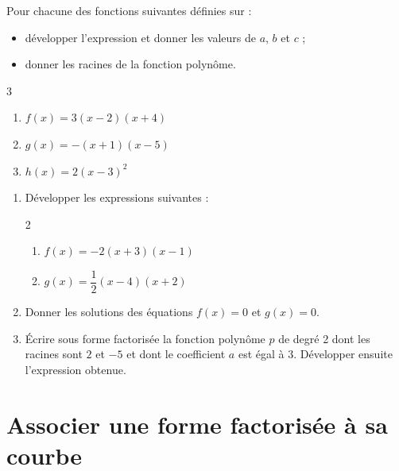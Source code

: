 \documentclass[11pt,a4paper]{book}
\begin{document}
\exerciceDS{}

Pour chacune des fonctions suivantes définies sur \R :
\begin{itemize}
	\item développer l'expression et donner les valeurs de $a$, $b$ et $c$ ;
	\item donner les racines de la fonction polynôme.
\end{itemize}

\begin{multicols}{3}
	\begin{enumerate}[label=\textbf{\alph*)}]
		\item $f(x)=3(x-2)(x+4)$
		\item $g(x)=-(x+1)(x-5)$
		\item $h(x)=2(x-3)^2$
	\end{enumerate}
\end{multicols}

\exerciceDS{}

\begin{enumerate}[label=\textbf{\arabic*)}]
	\item Développer les expressions suivantes :
	\begin{multicols}{2}
		\begin{enumerate}[label=\textbf{\alph*)}]
			\item $f(x)=-2(x+3)(x-1)$
			\item $g(x)=\dfrac{1}{2}(x-4)(x+2)$
		\end{enumerate}
	\end{multicols}
	\item Donner les solutions des équations $f(x)=0$ et $g(x)=0$.
	\item Écrire sous forme factorisée la fonction polynôme $p$ de degré 2 dont les racines sont $2$ et $-5$ et dont le coefficient $a$ est égal à $3$. Développer ensuite l'expression obtenue.
\end{enumerate}

\section*{\color{green!55!black}Associer une forme factorisée à sa courbe}

\exerciceDS{}
\end{document}

